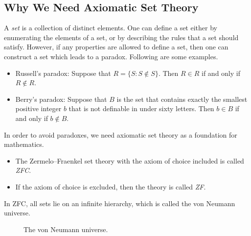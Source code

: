 \documentclass[11pt]{article}
\DeclareMathOperator{\pow}{Pow}
\begin{document}
\subsection{Why We Need Axiomatic Set Theory}
A \emph{set} is a collection of distinct elements.
One can define a set either by enumerating the elements of a set, or by describing the rules that a set should satisfy.
However, if any properties are allowed to define a set, then one can construct a set which leads to a paradox.
Following are some examples.

\begin{itemize}
  \item Russell's paradox: Suppose that $R = \{S: S \notin S\}$. Then $R \in R$ if and only if $R \notin R$.
  \item Berry's paradox: Suppose that $B$ is the set that contains exactly the smallest positive integer $b$ that is not definable in under sixty letters. Then $b \in B$ if and only if $b \notin B$.
\end{itemize}
%
In order to avoid paradoxes, we need axiomatic set theory as a foundation for mathematics.

\begin{itemize}
  \item The Zermelo--Fraenkel set theory with the axiom of choice included is called \emph{ZFC}.
  \item If the axiom of choice is excluded, then the theory is called \emph{ZF}.
\end{itemize}
%
In ZFC, all sets lie on an infinite hierarchy, which is called the von Neumann universe.

\begin{figure}[h]
  \centering
  \caption{The von Neumann universe.}
\end{figure}
\end{document}
